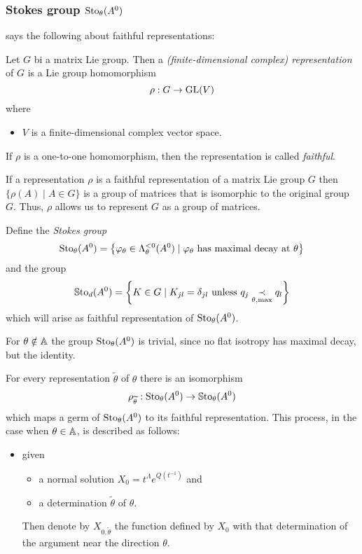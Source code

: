\subsubsection{Stokes group $\operatorname{Sto}_\theta(A^0)$}
\cite[Def.4.1]{hall2003lie} says the following about faithful
representations:
\begin{defn}
  Let $G$ bi a matrix Lie group. Then a \emph{(finite-dimensional complex)
  representation} of $G$ is a Lie group homomorphism
  \[
    \rho:G\to\operatorname{GL}(V)
  \]
  where
  \begin{itemize}
    \item $V$ is a finite-dimensional complex vector space.
  \end{itemize}
  If $\rho$ is a one-to-one homomorphism, then the representation is called
  \emph{faithful}.
  \begin{comment}
    \textbf{Other criterion:}
    If the associated homomorphism $G\to\Aut(V)$ is injective, then the
    representation is \emph{faithful}.
  \end{comment}
  \begin{rem}
    If a representation $\rho$ is a faithful representation of a matrix Lie
    group $G$ then $\{\rho(A)\mid A\in G\}$ is a group of matrices that is
    isomorphic to the original group $G$. Thus, $\rho$ allows us to represent
    $G$ as a group of matrices.
  \end{rem}
\end{defn}
\begin{defn}
  Define the \emph{Stokes group}
  \[
    \operatorname{Sto}_\theta(A^0)=
    \left\{\varphi_\theta\in\Lambda_\theta^{<0}(A^0)
      \mid \varphi_\theta \text{ has maximal decay at } \theta
    \right\}
  \]
  and the group
  \[
    \operatorname{\mathbb{S}to}_d(A^0)= \left\{K\in G\mid K_{jl}=\delta_{jl} \text{ unless }
      q_j \underset{\theta,\max}{\prec} q_l \right\}
  \]
  which will arise as faithful representation of $\operatorname{Sto}_\theta(A^0)$.
  \begin{rem}
    For $\theta\notin\mathbb{A}$ the group $\operatorname{Sto}_\theta(A^0)$ is trivial, since no flat
    isotropy has maximal decay, but the identity.
  \end{rem}
\end{defn}
For every representation $\tilde\theta$ of $\theta$ there is an isomorphism
\[
  \rho_{\widetilde\theta}:\operatorname{Sto}_\theta(A^0)\to\operatorname{\mathbb{S}to}_\theta(A^0)
\]
which maps a germ of $\operatorname{Sto}_\theta(A^0)$ to its faithful representation. This
process, in the case when $\theta\in\mathbb{A}$, is described as follows:
\begin{itemize}
  \item[] given
    \begin{itemize}
      \item a normal solution $X_0=t^\Lambda e^{Q(t^{-1})}$ and
      \item a determination $\tilde\theta$ of $\theta$.
    \end{itemize}
    Then denote by $X_{0,\tilde\theta}$ the function defined by $X_0$ with that
    determination of the argument near the direction $\theta$.
\end{itemize}
